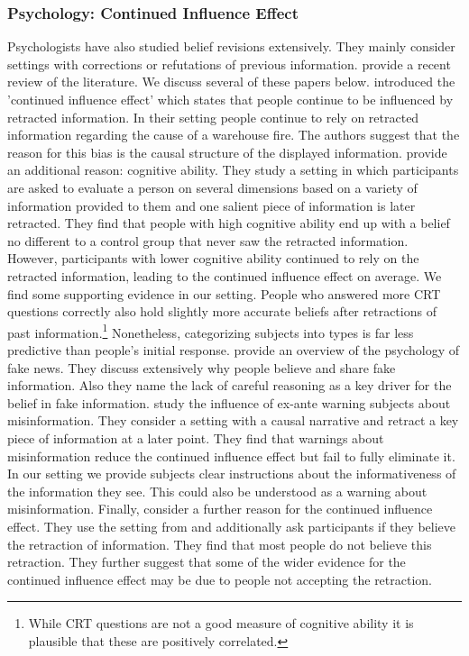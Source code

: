 \documentclass{article}
\begin{document}
\subsubsection*{Psychology: Continued Influence Effect}

Psychologists have also studied belief revisions extensively. They mainly consider settings with corrections or refutations of previous information. \cite{Ecker2022} provide a recent review of the literature. We discuss several of these papers below. \cite{Johnson1994} introduced the 'continued influence effect' which states that people continue to be influenced by retracted information. In their setting people continue to rely on retracted information regarding the cause of a warehouse fire. The authors suggest that the reason for this bias is the causal structure of the displayed information. \cite{Roets2017} provide an additional reason: cognitive ability. They study a setting in which participants are asked to evaluate a person on several dimensions based on a variety of information provided to them and one salient piece of information is later retracted. They find that people with high cognitive ability end up with a belief no different to a control group that never saw the retracted information. However, participants with lower cognitive ability continued to rely on the retracted information, leading to the continued influence effect on average. We find some supporting evidence in our setting. People who answered more CRT questions correctly also hold slightly more accurate beliefs after retractions of past information.\footnote{While CRT questions are not a good measure of cognitive ability it is plausible that these are positively correlated.} Nonetheless, categorizing subjects into types is far less predictive than people's initial response. \cite{Pennycook2021} provide an overview of the psychology of fake news. They discuss extensively why people believe and share fake information. Also they name the lack of careful reasoning as a key driver for the belief in fake information. \cite{Ecker2010} study the influence of ex-ante warning subjects about misinformation. They consider a setting with a causal narrative and retract a key piece of information at a later point. They find that warnings about misinformation reduce the continued influence effect but fail to fully eliminate it. In our setting we provide subjects clear instructions about the informativeness of the information they see. This could also be understood as a warning about misinformation. Finally, \cite{Orear2020} consider a further reason for the continued influence effect. They use the setting from \cite{Ecker2010} and additionally ask participants if they believe the retraction of information. They find that most people do not believe this retraction. They further suggest that some of the wider evidence for the continued influence effect may be due to people not accepting the retraction.
\end{document}
